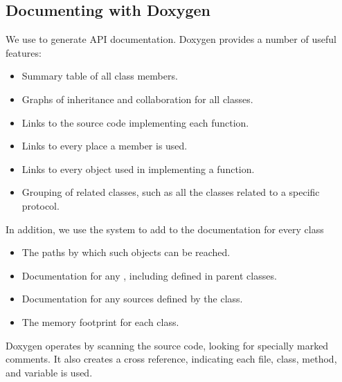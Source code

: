 \documentclass[letterpaper,10pt,english]{sphinxmanual}
\renewcommand{\sphinxcode}[1]{\texttt{\small{#1}}}
\begin{document}
\subsection{Documenting with Doxygen}
\label{\detokenize{documentation:documenting-with-doxygen}}
We use  to generate  API documentation.  Doxygen
provides a number of useful features:
\begin{itemize}
\item {} 
Summary table of all class members.

\item {} 
Graphs of inheritance and collaboration for all classes.

\item {} 
Links to the source code implementing each function.

\item {} 
Links to every place a member is used.

\item {} 
Links to every object used in implementing a function.

\item {} 
Grouping of related classes, such as all the classes related to
a specific protocol.

\end{itemize}

In addition, we use the \sphinxcode{} system to add to the documentation
for every class
\begin{itemize}
\item {} 
The \sphinxcode{} paths by which such objects can be reached.

\item {} 
Documentation for any \sphinxcode{}, including \sphinxcode{\sphinxupquote{Attributes}}
defined in parent classes.

\item {} 
Documentation for any \sphinxcode{} sources defined by the class.

\item {} 
The memory footprint for each class.

\end{itemize}

Doxygen operates by scanning the source code, looking for
specially marked comments.  It also creates a cross reference,
indicating  each file, class, method, and variable is used.
\end{document}
